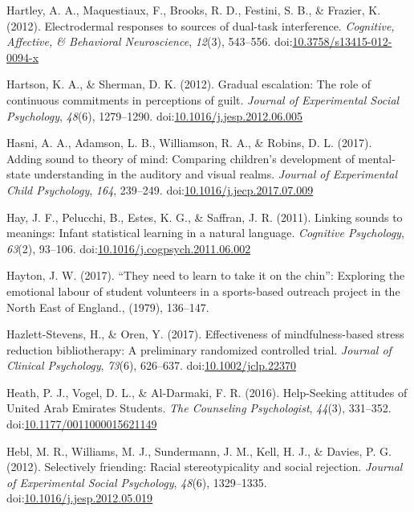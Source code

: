 \documentclass[english,man]{apa6}
\begin{document}
\hypertarget{ref-Hartley2012}{}
Hartley, A. A., Maquestiaux, F., Brooks, R. D., Festini, S. B., \&
Frazier, K. (2012). Electrodermal responses to sources of dual-task
interference. \emph{Cognitive, Affective, \& Behavioral Neuroscience},
\emph{12}(3), 543--556.
doi:\href{https://doi.org/10.3758/s13415-012-0094-x}{10.3758/s13415-012-0094-x}

\hypertarget{ref-Hartson2012}{}
Hartson, K. A., \& Sherman, D. K. (2012). Gradual escalation: The role
of continuous commitments in perceptions of guilt. \emph{Journal of
Experimental Social Psychology}, \emph{48}(6), 1279--1290.
doi:\href{https://doi.org/10.1016/j.jesp.2012.06.005}{10.1016/j.jesp.2012.06.005}

\hypertarget{ref-Hasni2017}{}
Hasni, A. A., Adamson, L. B., Williamson, R. A., \& Robins, D. L.
(2017). Adding sound to theory of mind: Comparing children's development
of mental-state understanding in the auditory and visual realms.
\emph{Journal of Experimental Child Psychology}, \emph{164}, 239--249.
doi:\href{https://doi.org/10.1016/j.jecp.2017.07.009}{10.1016/j.jecp.2017.07.009}

\hypertarget{ref-Hay2011}{}
Hay, J. F., Pelucchi, B., Estes, K. G., \& Saffran, J. R. (2011).
Linking sounds to meanings: Infant statistical learning in a natural
language. \emph{Cognitive Psychology}, \emph{63}(2), 93--106.
doi:\href{https://doi.org/10.1016/j.cogpsych.2011.06.002}{10.1016/j.cogpsych.2011.06.002}

\hypertarget{ref-Hayton2017}{}
Hayton, J. W. (2017). ``They need to learn to take it on the chin'':
Exploring the emotional labour of student volunteers in a sports-based
outreach project in the North East of England., (1979), 136--147.

\hypertarget{ref-Hazlett-Stevens2017}{}
Hazlett-Stevens, H., \& Oren, Y. (2017). Effectiveness of
mindfulness-based stress reduction bibliotherapy: A preliminary
randomized controlled trial. \emph{Journal of Clinical Psychology},
\emph{73}(6), 626--637.
doi:\href{https://doi.org/10.1002/jclp.22370}{10.1002/jclp.22370}

\hypertarget{ref-Heath2016}{}
Heath, P. J., Vogel, D. L., \& Al-Darmaki, F. R. (2016). Help-Seeking
attitudes of United Arab Emirates Students. \emph{The Counseling
Psychologist}, \emph{44}(3), 331--352.
doi:\href{https://doi.org/10.1177/0011000015621149}{10.1177/0011000015621149}

\hypertarget{ref-Hebl2012}{}
Hebl, M. R., Williams, M. J., Sundermann, J. M., Kell, H. J., \& Davies,
P. G. (2012). Selectively friending: Racial stereotypicality and social
rejection. \emph{Journal of Experimental Social Psychology},
\emph{48}(6), 1329--1335.
doi:\href{https://doi.org/10.1016/j.jesp.2012.05.019}{10.1016/j.jesp.2012.05.019}
\end{document}
